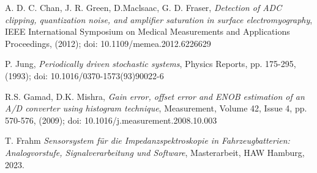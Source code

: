 \begin{thebibliography}{[99]}
	A. D. C. Chan, J. R. Green, D.Maclsaac, G. D. Fraser, \textit{Detection of ADC clipping, quantization noise, and amplifier saturation in surface electromyography}, IEEE International Symposium on Medical Measurements and Applications Proceedings, (2012); doi: 10.1109/memea.2012.6226629 
	
	P. Jung, \textit{Periodically driven stochastic systems}, Physics Reports,  pp. 175-295, (1993); doi:  10.1016/0370-1573(93)90022-6 

	R.S. Gamad, D.K. Mishra,
	\textit{Gain error, offset error and ENOB estimation of an A/D converter using histogram technique},
	Measurement, Volume 42, Issue 4, pp. 570-576, (2009); doi: 10.1016/j.measurement.2008.10.003 

	T. Frahm \textit{Sensorsystem für die Impedanzspektroskopie in Fahrzeugbatterien: Analogvorstufe, Signalverarbeitung und Software}, Masterarbeit, HAW Hamburg, 2023.


	
\end{thebibliography}
	

 
 